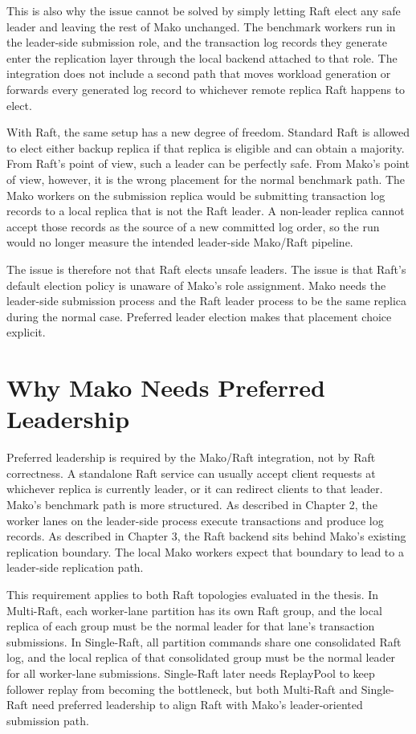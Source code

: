 This is also why the issue cannot be solved by simply letting Raft elect any
safe leader and leaving the rest of Mako unchanged. The benchmark workers run in
the leader-side submission role, and the transaction log records they generate
enter the replication layer through the local backend attached to that role.
The integration does not include a second path that moves workload generation
or forwards every generated log record to whichever remote replica Raft happens
to elect.

With Raft, the same setup has a new degree of freedom. Standard Raft is allowed
to elect either backup replica if that replica is eligible and can obtain a
majority. From Raft's point of view, such a leader can be perfectly safe. From
Mako's point of view, however, it is the wrong placement for the normal
benchmark path. The Mako workers on the submission replica would be submitting
transaction log records to a local replica that is not the Raft leader. A
non-leader replica cannot accept those records as the source of a new committed
log order, so the run would no longer measure the intended leader-side
Mako/Raft pipeline.

The issue is therefore not that Raft elects unsafe leaders. The issue is that
Raft's default election policy is unaware of Mako's role assignment. Mako needs
the leader-side submission process and the Raft leader process to be the same
replica during the normal case. Preferred leader election makes that placement
choice explicit.

\section{Why Mako Needs Preferred Leadership}

Preferred leadership is required by the Mako/Raft integration, not by Raft
correctness. A standalone Raft service can usually accept client requests at
whichever replica is currently leader, or it can redirect clients to that
leader. Mako's benchmark path is more structured. As described in Chapter 2, the
worker lanes on the leader-side process execute transactions and produce log
records. As described in Chapter 3, the Raft backend sits behind Mako's existing
replication boundary. The local Mako workers expect that boundary to lead to a
leader-side replication path.

This requirement applies to both Raft topologies evaluated in the thesis. In
Multi-Raft, each worker-lane partition has its own Raft group, and the local
replica of each group must be the normal leader for that lane's transaction
submissions. In Single-Raft, all partition commands share one consolidated Raft
log, and the local replica of that consolidated group must be the normal leader
for all worker-lane submissions. Single-Raft later needs ReplayPool to keep
follower replay from becoming the bottleneck, but both Multi-Raft and
Single-Raft need preferred leadership to align Raft with Mako's leader-oriented
submission path.

